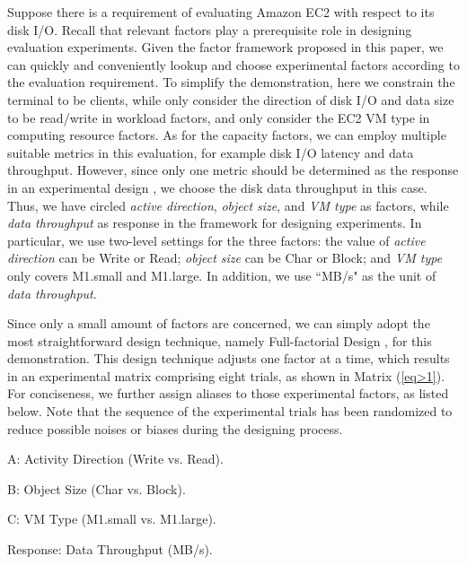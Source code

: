 \documentclass[10pt, conference, compsocconf]{IEEEtran}
\begin{document}
Suppose there is a requirement of evaluating Amazon EC2 with respect to its disk I/O. Recall that relevant factors play a prerequisite role in designing evaluation experiments. Given the factor framework proposed in this paper, we can quickly and conveniently lookup and choose experimental factors according to the evaluation requirement. To simplify the demonstration, here we constrain the terminal to be clients, while only consider the direction of disk I/O and data size to be read/write in workload factors, and only consider the EC2 VM type in computing resource factors. As for the capacity factors, we can employ multiple suitable metrics in this evaluation, for example disk I/O latency and data throughput. However, since only one metric should be determined as the response in an experimental design \cite{Antony_2003}, we choose the disk data throughput in this case. Thus, we have circled \textit{active direction}, \textit{object size}, and \textit{VM type} as factors, while \textit{data throughput} as response in the framework for designing experiments. In particular, we use two-level settings for the three factors: the value of \textit{active direction} can be Write or Read; \textit{object size} can be Char or Block; and \textit{VM type} only covers M1.small and M1.large. In addition, we use ``MB/s" as the unit of \textit{data throughput}.

Since only a small amount of factors are concerned, we can simply adopt the most straightforward design technique, namely Full-factorial Design \cite{Antony_2003}, for this demonstration. This design technique adjusts one factor at a time, which results in an experimental matrix comprising eight trials, as shown in Matrix (\ref{eq>1}). For conciseness, we further assign aliases to those experimental factors, as listed below. Note that the sequence of the experimental trials has been randomized to reduce possible noises or biases \cite{Antony_2003} during the designing process. 

\begin{itemize*}
    \item	A: Activity Direction (Write vs. Read).
    \item	B: Object Size (Char vs. Block). 
    \item	C: VM Type (M1.small vs. M1.large).
    \item	Response: Data Throughput (MB/s).
\end{itemize*}
\end{document}
